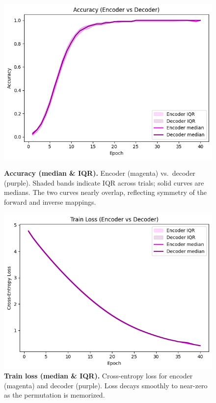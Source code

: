 \documentclass[12pt]{article}
\theoremstyle{plain}
\theoremstyle{remark}
\begin{document}
\begin{figure}[h]
    \centering
    \begin{minipage}[t]{0.48\textwidth}
        \centering
        \includegraphics[width=\textwidth]{accuracy.png}
        \caption{\textbf{Accuracy (median \& IQR).} Encoder (magenta) vs.\ decoder (purple). Shaded bands indicate IQR across trials; solid curves are medians. The two curves nearly overlap, reflecting symmetry of the forward and inverse mappings.}
        \label{fig:acc-curves}
    \end{minipage}
    \hfill
    \begin{minipage}[t]{0.48\textwidth}
        \centering
        \includegraphics[width=\textwidth]{train_loss.png}
        \caption{\textbf{Train loss (median \& IQR).} Cross-entropy loss for encoder (magenta) and decoder (purple). Loss decays smoothly to near-zero as the permutation is memorized.}
        \label{fig:loss-curves}
    \end{minipage}
\end{figure}
\end{document}

